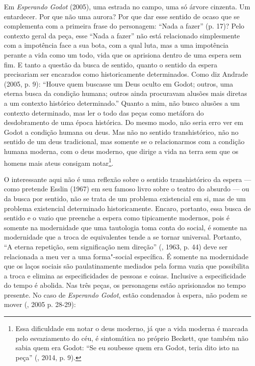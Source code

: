 Em \emph{Esperando Godot} (2005), uma estrada no campo, uma só árvore
cinzenta. Um entardecer. Por que não uma aurora? Por que dar esse
sentido de ocaso que se complementa com a primeira frase do personagem:
``Nada a fazer'' (p. 17)? Pelo contexto geral da peça, esse ``Nada a
fazer'' não está relacionado simplesmente com a impotência face a sua
bota, com a qual luta, mas a uma impotência perante a vida como um todo,
vida que os aprisiona dentro de uma espera sem fim. E tanto a questão da
busca de sentido, quanto o sentido da espera precisariam ser encarados
como historicamente determinados. Como diz Andrade (2005, p. 9): ``Houve
quem buscasse um Deus oculto em Godot; outros, uma eterna busca da
condição humana; outros ainda procuravam alusões mais diretas a um
contexto histórico determinado.'' Quanto a mim, não busco alusões a
um contexto determinado, mas ler o todo das peças como metáfora do
desdobramento de uma época histórica. Do mesmo modo, não seria erro ver
em Godot a condição humana ou deus. Mas não no sentido transhistórico,
não no sentido de um deus tradicional, mas somente se o relacionarmos
com a condição humana moderna, com o deus moderno, que dirige a vida na
terra sem que os homens mais ateus consigam notar\footnote{Essa
  dificuldade em notar o deus moderno, já que a vida moderna é marcada
  pelo esvaziamento do céu, é sintomática no próprio Beckett, que também
  não sabia quem era Godot: ``Se eu soubesse quem era Godot, teria dito
  isto na peça'' (, 2014, p. 9).}.

O interessante aqui não é uma reflexão sobre o sentido transhistórico da
espera --- como pretende Esslin (1967) em seu famoso livro sobre o teatro
do absurdo --- ou da busca por sentido, não se trata de um problema
existencial em si, mas de um problema existencial determinado
historicamente. Encaro, portanto, essa busca de sentido e o vazio que
preenche a espera como tipicamente modernos, pois é somente na
modernidade que uma tautologia toma conta do social, é somente na
modernidade que a troca de equivalentes tende a se tornar universal.
Portanto, ``A eterna repetição, sem significação nem direção'' (,
1963, p. 44) deve ser relacionada a meu ver a uma forma"-social
específica. É somente na modernidade que os laços sociais são
paulatinamente mediados pela forma vazia que possibilita a troca e
elimina as especificidades de pessoas e coisas. Inclusive a
especificidade do tempo é abolida. Nas três peças, os personagens estão
aprisionados no tempo presente. No caso de \emph{Esperando Godot}, estão condenados à espera, não podem se mover (, 2005 p. 28-29):

